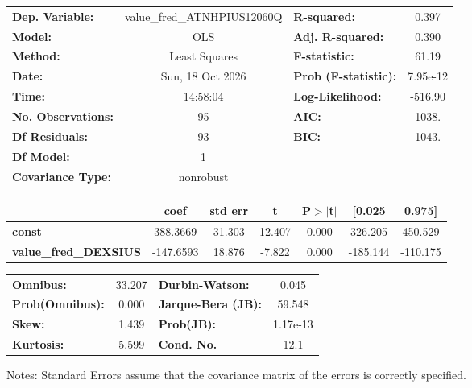 \begin{center}
\begin{tabular}{lclc}
\toprule
\textbf{Dep. Variable:}       & value\_fred\_ATNHPIUS12060Q & \textbf{  R-squared:         } &     0.397   \\
\textbf{Model:}               &             OLS             & \textbf{  Adj. R-squared:    } &     0.390   \\
\textbf{Method:}              &        Least Squares        & \textbf{  F-statistic:       } &     61.19   \\
\textbf{Date:}                &       Sun, 18 Oct 2026      & \textbf{  Prob (F-statistic):} &  7.95e-12   \\
\textbf{Time:}                &           14:58:04          & \textbf{  Log-Likelihood:    } &   -516.90   \\
\textbf{No. Observations:}    &                95           & \textbf{  AIC:               } &     1038.   \\
\textbf{Df Residuals:}        &                93           & \textbf{  BIC:               } &     1043.   \\
\textbf{Df Model:}            &                 1           & \textbf{                     } &             \\
\textbf{Covariance Type:}     &          nonrobust          & \textbf{                     } &             \\
\bottomrule
\end{tabular}
\begin{tabular}{lcccccc}
                              & \textbf{coef} & \textbf{std err} & \textbf{t} & \textbf{P$> |$t$|$} & \textbf{[0.025} & \textbf{0.975]}  \\
\midrule
\textbf{const}                &     388.3669  &       31.303     &    12.407  &         0.000        &      326.205    &      450.529     \\
\textbf{value\_fred\_DEXSIUS} &    -147.6593  &       18.876     &    -7.822  &         0.000        &     -185.144    &     -110.175     \\
\bottomrule
\end{tabular}
\begin{tabular}{lclc}
\textbf{Omnibus:}       & 33.207 & \textbf{  Durbin-Watson:     } &    0.045  \\
\textbf{Prob(Omnibus):} &  0.000 & \textbf{  Jarque-Bera (JB):  } &   59.548  \\
\textbf{Skew:}          &  1.439 & \textbf{  Prob(JB):          } & 1.17e-13  \\
\textbf{Kurtosis:}      &  5.599 & \textbf{  Cond. No.          } &     12.1  \\
\bottomrule
\end{tabular}
\end{center}

Notes: \newline
 [1] Standard Errors assume that the covariance matrix of the errors is correctly specified.